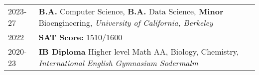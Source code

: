

\renewcommand{\thefootnote}{\fnsymbol{footnote}}
\setcounter{footnote}{0}

\begin{longtable}[l]{@{}p{} p{}}

    2023-27 & \textbf{B.A.} Computer Science, \textbf{B.A.} Data Science\footnotemark, \textbf{Minor} Bioengineering, \emph{University of California, Berkeley} \\

    2022 & \textbf{SAT Score:} 1510/1600\\

    2020-23 & \textbf{IB Diploma} Higher level Math AA, Biology, Chemistry, \emph{International English Gymnasium Sodermalm} \\
\end{longtable}



\renewcommand{\thefootnote}{\arabic{footnote}}
\setcounter{footnote}{1}
